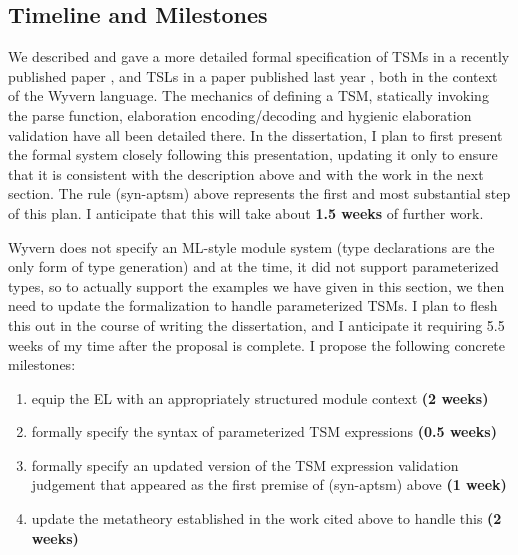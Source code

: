\subsection{Timeline and Milestones}\label{sec:syntax-timeline}
We described and gave a more detailed formal specification of TSMs in a recently published paper \cite{sac15}, and TSLs in a paper published last year \cite{TSLs}, both in the context of the Wyvern language. The mechanics of defining a TSM, statically invoking the parse function, elaboration encoding/decoding and hygienic elaboration validation have all been detailed there. In the dissertation, I plan to first present the formal system closely following this presentation, updating it only to ensure that it is consistent with the description above and with the work in the next section. The rule (syn-aptsm) above represents the first and most substantial step of this plan. I anticipate that this will take about \textbf{1.5 weeks} of further work.

Wyvern does not specify an ML-style module system (type declarations are the only form of type generation) and at the time, it did not support parameterized types, so to actually support the examples we have given in this section, we then need to update the formalization to handle parameterized TSMs. I plan to flesh this out in the course of writing the dissertation, and I anticipate it requiring 5.5 weeks of my time after the proposal is complete. I propose the following concrete milestones:

\begin{enumerate}
\item equip the EL with an appropriately structured module context \textbf{(2 weeks)}
\item formally specify the syntax of parameterized TSM expressions \textbf{(0.5 weeks)}
\item formally specify an updated version of the TSM expression validation judgement that appeared as the first premise of (syn-aptsm) above \textbf{(1 week)}
\item update the metatheory established in the work cited above to handle this \textbf{(2 weeks)}
\end{enumerate}

